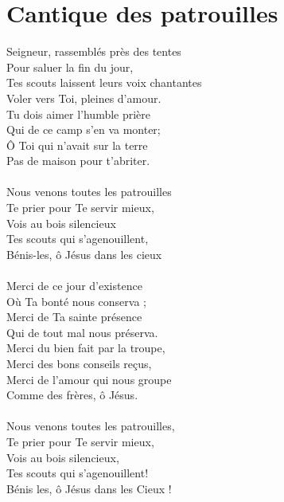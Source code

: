 \section*{Cantique des patrouilles}
Seigneur, rassemblés près des tentes\\
Pour saluer la fin du jour,\\
Tes scouts laissent leurs voix chantantes\\
Voler vers Toi, pleines d'amour.\\
Tu dois aimer l'humble prière\\
Qui de ce camp s'en va monter;\\
Ô Toi qui n'avait sur la terre\\
Pas de maison pour t'abriter.\\\\
Nous venons toutes les patrouilles\\
Te prier pour Te servir mieux,\\
Vois au bois silencieux\\
Tes scouts qui s'agenouillent,\\
Bénis-les, ô Jésus dans les cieux\\\\
Merci de ce jour d’existence\\
Où Ta bonté nous conserva ;\\
Merci de Ta sainte présence\\
Qui de tout mal nous préserva.\\
Merci du bien fait par la troupe,\\
Merci des bons conseils reçus,\\
Merci de l’amour qui nous groupe\\
Comme des frères, ô Jésus.\\\\
Nous venons toutes les patrouilles,\\
Te prier pour Te servir mieux,\\
Vois au bois silencieux,\\
Tes scouts qui s’agenouillent!\\
Bénis les, ô Jésus dans les Cieux !\\